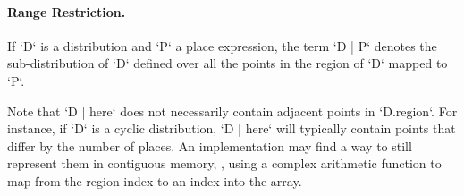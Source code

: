 {\paragraph{Range Restriction.}

If \xcd`D` is a distribution and \xcd`P` a place expression, the term
\xcd`D | P` 
denotes the sub-distribution of \xcd`D` defined over all the
points in the region of \xcd`D` mapped to \xcd`P`.

Note that \xcd`D | here` does not necessarily contain adjacent points
in \xcd`D.region`. For instance, if \xcd`D` is a cyclic distribution,
\xcd`D | here` will typically contain points that differ by the number of
places. 
An implementation may find a
way to still represent them in contiguous memory, \eg, using a
complex arithmetic function to map from the region index to an index
into the array.




}

